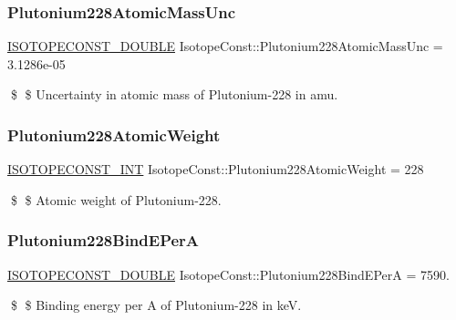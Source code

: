 \subsubsection{\texorpdfstring{Plutonium228\+Atomic\+Mass\+Unc}{Plutonium228AtomicMassUnc}}
{\footnotesize\ttfamily \mbox{\hyperlink{group___isotope_const-_macros_ga8f45a7272ce02c0b4c65c44636ed719a}{I\+S\+O\+T\+O\+P\+E\+C\+O\+N\+S\+T\+\_\+\+D\+O\+U\+B\+LE}} Isotope\+Const\+::\+Plutonium228\+Atomic\+Mass\+Unc = 3.\+1286e-\/05}

\$ \$ Uncertainty in atomic mass of Plutonium-\/228 in amu. \mbox{\label{group___isotope_const-_plutonium-_pu228_ga66c0e15245a43a94c0ae8886eaabe97c}} 
\subsubsection{\texorpdfstring{Plutonium228\+Atomic\+Weight}{Plutonium228AtomicWeight}}
{\footnotesize\ttfamily \mbox{\hyperlink{group___isotope_const-_macros_ga5f18360b3e99483a35c32d789e62621c}{I\+S\+O\+T\+O\+P\+E\+C\+O\+N\+S\+T\+\_\+\+I\+NT}} Isotope\+Const\+::\+Plutonium228\+Atomic\+Weight = 228}

\$ \$ Atomic weight of Plutonium-\/228. \mbox{\label{group___isotope_const-_plutonium-_pu228_ga99d977008530d12fe222d0cef17d2aa0}} 
\subsubsection{\texorpdfstring{Plutonium228\+Bind\+E\+PerA}{Plutonium228BindEPerA}}
{\footnotesize\ttfamily \mbox{\hyperlink{group___isotope_const-_macros_ga8f45a7272ce02c0b4c65c44636ed719a}{I\+S\+O\+T\+O\+P\+E\+C\+O\+N\+S\+T\+\_\+\+D\+O\+U\+B\+LE}} Isotope\+Const\+::\+Plutonium228\+Bind\+E\+PerA = 7590.}

\$ \$ Binding energy per A of Plutonium-\/228 in keV. \mbox{\label{group___isotope_const-_plutonium-_pu228_gafd89f91451c89d6757595bcc1dfad365}} 
